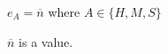 \begin{case}

$e_{A}=\overline{n}$ where $A\in\lbrace H,M,S\rbrace$

$\overline{n}$ is a value.

\end{case}